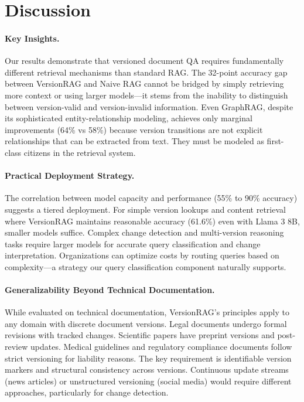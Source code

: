 \section{Discussion}

\paragraph{Key Insights.}
Our results demonstrate that versioned document QA requires fundamentally different retrieval mechanisms than standard RAG. The 32-point accuracy gap between VersionRAG and Naive RAG cannot be bridged by simply retrieving more context or using larger models—it stems from the inability to distinguish between version-valid and version-invalid information. Even GraphRAG, despite its sophisticated entity-relationship modeling, achieves only marginal improvements (64\% vs 58\%) because version transitions are not explicit relationships that can be extracted from text. They must be modeled as first-class citizens in the retrieval system.

\paragraph{Practical Deployment Strategy.}
The correlation between model capacity and performance (55\% to 90\% accuracy) suggests a tiered deployment. For simple version lookups and content retrieval where VersionRAG maintains reasonable accuracy (61.6\%) even with Llama 3 8B, smaller models suffice. Complex change detection and multi-version reasoning tasks require larger models for accurate query classification and change interpretation. Organizations can optimize costs by routing queries based on complexity—a strategy our query classification component naturally supports.

\paragraph{Generalizability Beyond Technical Documentation.}
While evaluated on technical documentation, VersionRAG's principles apply to any domain with discrete document versions. Legal documents undergo formal revisions with tracked changes. Scientific papers have preprint versions and post-review updates. Medical guidelines and regulatory compliance documents follow strict versioning for liability reasons. The key requirement is identifiable version markers and structural consistency across versions. Continuous update streams (news articles) or unstructured versioning (social media) would require different approaches, particularly for change detection.

